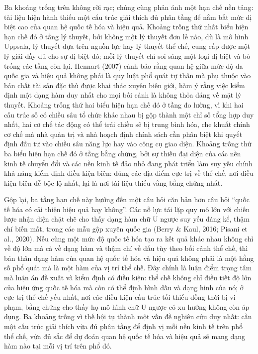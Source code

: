 \documentclass[
  a4paper,
  13pt]{extreport}
\begin{document}
Ba khoảng trống trên không rời rạc; chúng cùng phản ánh một hạn chế nền
tảng: tài liệu hiện hành thiếu một cấu trúc giải thích đủ phân tầng để
nắm bắt mức dị biệt cao của quan hệ quốc tế hóa và hiệu quả. Khoảng
trống thứ nhất biểu hiện hạn chế đó ở tầng lý thuyết, bởi không một lý
thuyết đơn lẻ nào, dù là mô hình Uppsala, lý thuyết dựa trên nguồn lực
hay lý thuyết thể chế, cung cấp được một lý giải đầy đủ cho sự dị biệt
đó; mỗi lý thuyết chỉ soi sáng một loại dị biệt và bỏ trống các tầng còn
lại. Hennart (2007) cảnh báo rằng quan hệ giữa mức độ đa quốc gia và
hiệu quả không phải là quy luật phổ quát tự thân mà phụ thuộc vào bản
chất tài sản đặc thù được khai thác xuyên biên giới, hàm ý rằng việc
kiểm định một dạng hàm duy nhất cho mọi bối cảnh là không thỏa đáng về
mặt lý thuyết. Khoảng trống thứ hai biểu hiện hạn chế đó ở tầng đo
lường, vì khi hai cấu trúc số có chiều sâu tổ chức khác nhau bị gộp
thành một chỉ số tổng hợp duy nhất, hai cơ chế tác động có thể trái
chiều sẽ bị trung bình hóa, che khuất chính cơ chế mà nhà quản trị và
nhà hoạch định chính sách cần phân biệt khi quyết định đầu tư vào chiều
sâu năng lực hay vào công cụ giao diện. Khoảng trống thứ ba biểu hiện
hạn chế đó ở tầng bằng chứng, bởi sự thiếu đại diện của các nền kinh tế
chuyển đổi và các nền kinh tế đảo nhỏ đang phát triển làm suy yếu chính
khả năng kiểm định điều kiện biên: đúng các địa điểm cực trị về thể chế,
nơi điều kiện biên dễ bộc lộ nhất, lại là nơi tài liệu thiếu vắng bằng
chứng nhất.

Gộp lại, ba tầng hạn chế này hướng đến một câu hỏi căn bản hơn câu hỏi
``quốc tế hóa có cải thiện hiệu quả hay không''. Các nỗ lực tái lặp quy
mô lớn với chiến lược nhận diện chặt chẽ cho thấy dạng hàm chữ U ngược
suy yếu đáng kể, thậm chí biến mất, trong các mẫu gộp xuyên quốc gia
(Berry \& Kaul, 2016; Pisani et al., 2020). Nếu cùng một mức độ quốc tế
hóa tạo ra kết quả khác nhau không chỉ về độ lớn mà cả về dạng hàm và
thậm chí về dấu tùy theo bối cảnh thể chế, thì bản thân dạng hàm của
quan hệ quốc tế hóa và hiệu quả không phải là một hằng số phổ quát mà là
một hàm của vị trí thể chế. Đây chính là luận điểm trọng tâm mà luận án
đề xuất và kiểm định có điều kiện: thể chế không chỉ điều tiết độ lớn
của hiệu ứng quốc tế hóa mà còn có thể định hình dấu và dạng hình của
nó; ở cực trị thể chế yếu nhất, nơi các điều kiện cấu trúc tối thiểu
đồng thời bị vi phạm, bằng chứng cho thấy họ mô hình chữ U ngược có xu
hướng không còn áp dụng. Ba khoảng trống vì thế hội tụ thành một vấn đề
nghiên cứu duy nhất: cần một cấu trúc giải thích vừa đủ phân tầng để
định vị mỗi nền kinh tế trên phổ thể chế, vừa đủ sắc để dự đoán quan hệ
quốc tế hóa và hiệu quả sẽ mang dạng hàm nào tại mỗi vị trí trên phổ đó.
\end{document}
